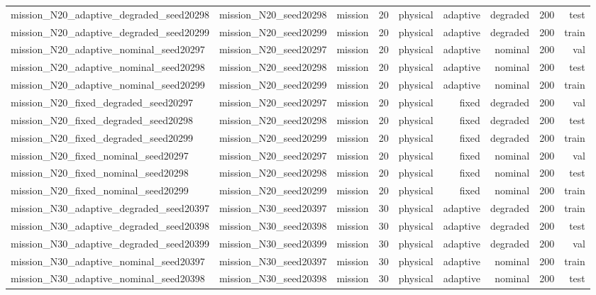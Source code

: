 \begin{tabular}{lrrrrrrrr}
mission\_N20\_adaptive\_degraded\_seed20298 & mission\_N20\_seed20298 & mission & 20 & physical & adaptive & degraded & 200 & test \\
mission\_N20\_adaptive\_degraded\_seed20299 & mission\_N20\_seed20299 & mission & 20 & physical & adaptive & degraded & 200 & train \\
mission\_N20\_adaptive\_nominal\_seed20297 & mission\_N20\_seed20297 & mission & 20 & physical & adaptive & nominal & 200 & val \\
mission\_N20\_adaptive\_nominal\_seed20298 & mission\_N20\_seed20298 & mission & 20 & physical & adaptive & nominal & 200 & test \\
mission\_N20\_adaptive\_nominal\_seed20299 & mission\_N20\_seed20299 & mission & 20 & physical & adaptive & nominal & 200 & train \\
mission\_N20\_fixed\_degraded\_seed20297 & mission\_N20\_seed20297 & mission & 20 & physical & fixed & degraded & 200 & val \\
mission\_N20\_fixed\_degraded\_seed20298 & mission\_N20\_seed20298 & mission & 20 & physical & fixed & degraded & 200 & test \\
mission\_N20\_fixed\_degraded\_seed20299 & mission\_N20\_seed20299 & mission & 20 & physical & fixed & degraded & 200 & train \\
mission\_N20\_fixed\_nominal\_seed20297 & mission\_N20\_seed20297 & mission & 20 & physical & fixed & nominal & 200 & val \\
mission\_N20\_fixed\_nominal\_seed20298 & mission\_N20\_seed20298 & mission & 20 & physical & fixed & nominal & 200 & test \\
mission\_N20\_fixed\_nominal\_seed20299 & mission\_N20\_seed20299 & mission & 20 & physical & fixed & nominal & 200 & train \\
mission\_N30\_adaptive\_degraded\_seed20397 & mission\_N30\_seed20397 & mission & 30 & physical & adaptive & degraded & 200 & train \\
mission\_N30\_adaptive\_degraded\_seed20398 & mission\_N30\_seed20398 & mission & 30 & physical & adaptive & degraded & 200 & test \\
mission\_N30\_adaptive\_degraded\_seed20399 & mission\_N30\_seed20399 & mission & 30 & physical & adaptive & degraded & 200 & val \\
mission\_N30\_adaptive\_nominal\_seed20397 & mission\_N30\_seed20397 & mission & 30 & physical & adaptive & nominal & 200 & train \\
mission\_N30\_adaptive\_nominal\_seed20398 & mission\_N30\_seed20398 & mission & 30 & physical & adaptive & nominal & 200 & test \\

\end{tabular}
